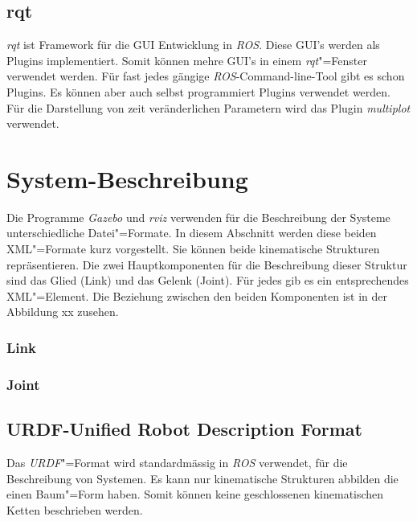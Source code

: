 \subsection{rqt}
\textit{rqt} ist Framework für die GUI Entwicklung in \textit{ROS}.
Diese GUI's werden als Plugins implementiert.
Somit können mehre GUI's in einem \textit{rqt}"=Fenster verwendet werden.
Für fast jedes gängige \textit{ROS}-Command-line-Tool gibt es schon Plugins. %
Es können aber auch selbst programmiert Plugins verwendet werden. 
Für die Darstellung von zeit veränderlichen Parametern wird das Plugin \textit{multiplot} verwendet. %



\section{System-Beschreibung}

Die Programme \textit{Gazebo} und \textit{rviz} verwenden für die Beschreibung der Systeme unterschiedliche Datei"=Formate.
In diesem Abschnitt werden diese beiden XML"=Formate kurz vorgestellt.
Sie können beide kinematische Strukturen repräsentieren.
Die zwei Hauptkomponenten für die Beschreibung dieser Struktur sind das Glied (Link) und das Gelenk (Joint).
Für jedes gib es ein entsprechendes XML"=Element.
Die Beziehung zwischen den beiden Komponenten ist in der Abbildung xx zusehen. %


\subsubsection*{Link}

\subsubsection*{Joint}

\subsection{URDF-Unified Robot Description Format}
Das \textit{URDF}"=Format wird standardmässig in \textit{ROS} verwendet, für die Beschreibung von Systemen.
Es kann nur kinematische Strukturen abbilden die einen Baum"=Form haben.
Somit können keine geschlossenen kinematischen Ketten beschrieben werden.


